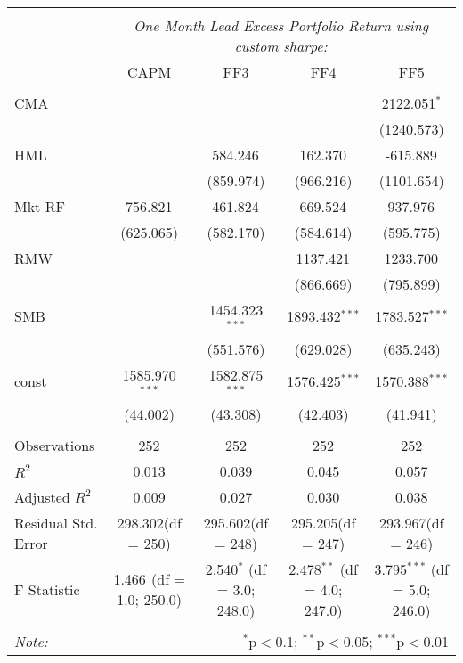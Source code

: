 \begin{table}[!htbp] \centering
\begin{tabular}{@{\extracolsep{5pt}}lcccc}
\\[-1.8ex]\hline
\hline \\[-1.8ex]
& \multicolumn{4}{c}{\textit{One Month Lead Excess Portfolio Return using custom sharpe:}} \
\cr \cline{4-5}
\\[-1.8ex] & CAPM & FF3 & FF4 & FF5 \\
\hline \\[-1.8ex]
 CMA & & & & 2122.051$^{*}$ \\
  & & & & (1240.573) \\
 HML & & 584.246$^{}$ & 162.370$^{}$ & -615.889$^{}$ \\
  & & (859.974) & (966.216) & (1101.654) \\
 Mkt-RF & 756.821$^{}$ & 461.824$^{}$ & 669.524$^{}$ & 937.976$^{}$ \\
  & (625.065) & (582.170) & (584.614) & (595.775) \\
 RMW & & & 1137.421$^{}$ & 1233.700$^{}$ \\
  & & & (866.669) & (795.899) \\
 SMB & & 1454.323$^{***}$ & 1893.432$^{***}$ & 1783.527$^{***}$ \\
  & & (551.576) & (629.028) & (635.243) \\
 const & 1585.970$^{***}$ & 1582.875$^{***}$ & 1576.425$^{***}$ & 1570.388$^{***}$ \\
  & (44.002) & (43.308) & (42.403) & (41.941) \\
\hline \\[-1.8ex]
 Observations & 252 & 252 & 252 & 252 \\
 $R^2$ & 0.013 & 0.039 & 0.045 & 0.057 \\
 Adjusted $R^2$ & 0.009 & 0.027 & 0.030 & 0.038 \\
 Residual Std. Error & 298.302(df = 250) & 295.602(df = 248) & 295.205(df = 247) & 293.967(df = 246)  \\
 F Statistic & 1.466$^{}$ (df = 1.0; 250.0) & 2.540$^{*}$ (df = 3.0; 248.0) & 2.478$^{**}$ (df = 4.0; 247.0) & 3.795$^{***}$ (df = 5.0; 246.0) \\
\hline
\hline \\[-1.8ex]
\textit{Note:} & \multicolumn{4}{r}{$^{*}$p$<$0.1; $^{**}$p$<$0.05; $^{***}$p$<$0.01} \\
\end{tabular}
\end{table}

